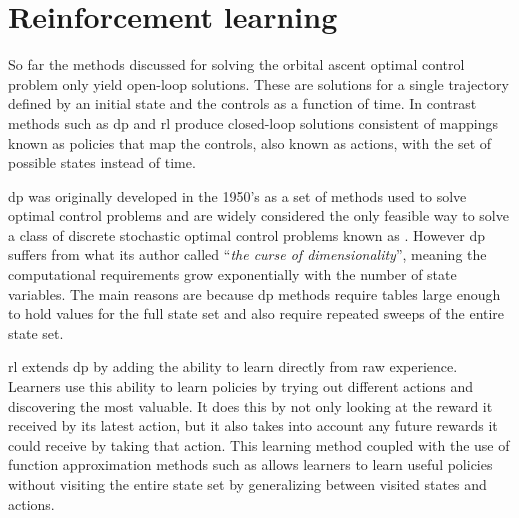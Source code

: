 \chapter{Reinforcement learning}
\label{ch:rl}

So far the methods discussed for solving the orbital ascent optimal control problem only yield open-loop solutions. These are solutions for a single trajectory defined by an initial state and the controls as a function of time. In contrast methods such as \acrfull{dp} and \acrfull{rl} produce closed-loop solutions consistent of mappings known as policies that map the controls, also known as actions, with the set of possible states instead of time.

\acrshort{dp} was originally developed in the 1950's as a set of methods used to solve optimal control problems and are widely considered the only feasible way to solve a class of discrete stochastic optimal control problems known as . However \acrshort{dp} suffers from what its author called ``\emph{the curse of dimensionality}'', meaning the computational requirements grow exponentially with the number of state variables. The main reasons are because \acrshort{dp} methods require tables large enough to hold values for the full state set and also require repeated sweeps of the entire state set. 

\acrshort{rl} extends \acrshort{dp} by adding the ability to learn directly from raw experience. Learners use this ability to learn policies by trying out different actions and discovering the most valuable. It does this by not only looking at the reward it received by its latest action, but it also takes into account any future rewards it could receive by taking that action. This learning method coupled with the use of function approximation methods such as  allows learners to learn useful policies without visiting the entire state set by generalizing between visited states and actions.

